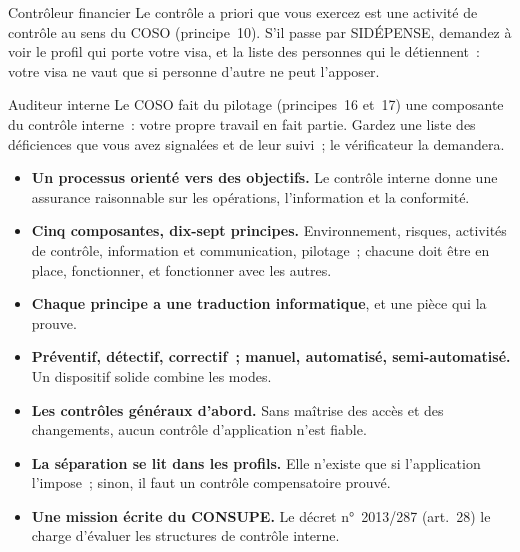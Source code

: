 \begin{boxmetier}{Contrôleur financier}
Le contrôle a priori que vous exercez est une activité de contrôle au sens
du COSO (principe~10). S'il passe par SIDÉPENSE, demandez à voir le profil
qui porte votre visa, et la liste des personnes qui le détiennent~: votre
visa ne vaut que si personne d'autre ne peut l'apposer.
\end{boxmetier}

\begin{boxmetier}{Auditeur interne}
Le COSO fait du pilotage (principes~16 et~17) une composante du contrôle
interne~: votre propre travail en fait partie. Gardez une liste des
déficiences que vous avez signalées et de leur suivi~; le vérificateur la
demandera.
\end{boxmetier}

\separateur

\begin{boxresume}
\begin{itemize}
    \item \textbf{Un processus orienté vers des objectifs.} Le contrôle
          interne donne une assurance raisonnable sur les opérations,
          l'information et la conformité.
    \item \textbf{Cinq composantes, dix-sept principes.} Environnement,
          risques, activités de contrôle, information et communication,
          pilotage~; chacune doit être en place, fonctionner, et
          fonctionner avec les autres.
    \item \textbf{Chaque principe a une traduction informatique}, et une
          pièce qui la prouve.
    \item \textbf{Préventif, détectif, correctif~; manuel, automatisé,
          semi-automatisé.} Un dispositif solide combine les modes.
    \item \textbf{Les contrôles généraux d'abord.} Sans maîtrise des accès
          et des changements, aucun contrôle d'application n'est fiable.
    \item \textbf{La séparation se lit dans les profils.} Elle n'existe que
          si l'application l'impose~; sinon, il faut un contrôle
          compensatoire prouvé.
    \item \textbf{Une mission écrite du CONSUPE.} Le décret n°~2013/287
          (art.~28) le charge d'évaluer les structures de contrôle
          interne.
\end{itemize}
\end{boxresume}

